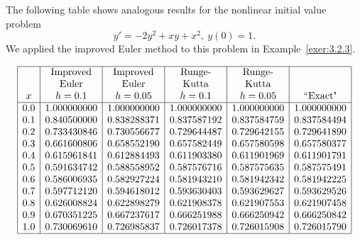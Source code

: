 \documentclass{ximera}
\begin{document}
\begin{example}\label{example:3.3.3}
The following table shows analogous results
for the nonlinear initial value problem
$$
y'=-2y^2+xy+x^2,\ y(0)=1.
$$
We applied the improved Euler  method to this problem in
Example~\ref{exer:3.2.3}.


$$
\begin{array}{|c|c|c|c|c|c|}
\hline
 & \text{Improved} & \text{Improved} & \text{Runge-} & \text{Runge-}& \\
 & \text{Euler} &\text{Euler} &\text{Kutta} & \text{Kutta}& \\
x&
h=0.1&
h=0.05&
h=0.1&
h=0.05&
\text{``Exact"}\\ \hline
0.0  &1.000000000 & 1.000000000 &1.000000000 & 1.000000000& 1.000000000 \\
0.1  &0.840500000 & 0.838288371 &0.837587192 & 0.837584759& 0.837584494 \\
0.2  &0.733430846 & 0.730556677 &0.729644487 & 0.729642155& 0.729641890 \\
0.3  &0.661600806 & 0.658552190 &0.657582449 & 0.657580598& 0.657580377 \\
0.4  &0.615961841 & 0.612884493 &0.611903380 & 0.611901969& 0.611901791 \\
0.5  &0.591634742 & 0.588558952 &0.587576716 & 0.587575635& 0.587575491 \\
0.6  &0.586006935 & 0.582927224 &0.581943210 & 0.581942342& 0.581942225 \\
0.7  &0.597712120 & 0.594618012 &0.593630403 & 0.593629627& 0.593629526 \\
0.8  &0.626008824 & 0.622898279 &0.621908378 & 0.621907553& 0.621907458 \\
0.9  &0.670351225 & 0.667237617 &0.666251988 & 0.666250942& 0.666250842 \\
1.0  &0.730069610 & 0.726985837 &0.726017378 & 0.726015908& 0.726015790\\
\hline
\end{array}
$$

\end{example}
\end{document}
